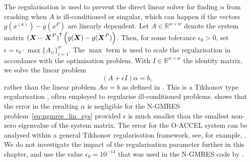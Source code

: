 \documentclass[main.tex]{subfiles}
\begin{document}
The regularisation is used to prevent the direct linear solver for
finding $\alpha$ from crashing when $A$ is ill-conditioned or
singular,
which can happen if the vectors $g(x^{(k)})-g(x^P)$ are linearly
dependent.  Let $A\in\mathbb R^{w\times w}$ denote the system matrix
${(\boldsymbol{X}-\boldsymbol{X}^P)}^\intercal\left(
  g(\boldsymbol{X})-g(\boldsymbol{X}^P) \right)$.  Then, for some
tolerance $\epsilon_0>0$, set
$\epsilon=\epsilon_0\cdot\max{\{A_{ii}\}}_{i=1}^w$. The $\max$ term is
used to scale the regularisation in accordance with the optimisation
problem.  With $I\in\mathbb{R}^{w\times w}$ the identity matrix, we
solve the linear problem
\begin{equation}
  (A+\epsilon I)\alpha = b,
\end{equation}
rather than the linear problem $A\alpha=b$ as defined in
.  This is a Tikhonov type
regularisation \citep{neumaier1998solving}, often employed to
regularise ill-conditioned problems.  \citet{washio1997krylov} shows
that the error in the resulting $\alpha$ is negligible for the N-GMRES
problem~\eqref{eq:ngmres_lin_sys} provided $\epsilon$ is much smaller
than the smallest non-zero eigenvalue of the system matrix.  The error
for the O-ACCEL system can be analysed within a general Tikhonov
regularisation framework, see, for example,
\citet{neumaier1998solving}. We do not investigate the impact of the
regularisation parameter further in this chapter, and use the value
$\epsilon_0=10^{-14}$ that was used in the N-GMRES code by
\citet{sterck2013steepest}.
\end{document}
